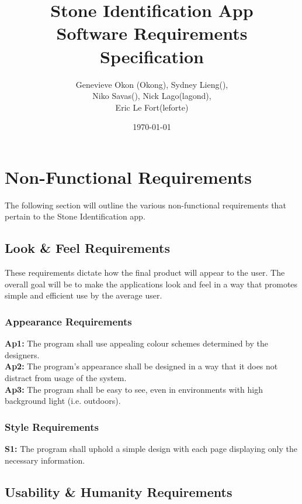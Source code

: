 \documentclass[titlepage]{article}
\begin{document}
\title{Stone Identification App \\
	Software Requirements Specification}
\author{Genevieve Okon (Okong), Sydney Lieng(),\\
	Niko Savas(), Nick Lago(lagond),\\
	Eric Le Fort(leforte)}
\date{\today}
\maketitle


\section{Non-Functional Requirements}
The following section will outline the various non-functional requirements that pertain to the Stone Identification app.

\subsection{Look \& Feel Requirements}
These requirements dictate how the final product will appear to the user. The overall goal will be to make the applications look and feel in a way that promotes simple and efficient use by the average user.
\subsubsection{Appearance Requirements}
\textbf{Ap1:} The program shall use appealing colour schemes determined by the designers.\\

\noindent\textbf{Ap2:} The program's appearance shall be designed in a way that it does not distract from usage of the system.\\

\noindent\textbf{Ap3:} The program shall be easy to see, even in environments with high background light (i.e. outdoors).

\subsubsection{Style Requirements}
\textbf{S1:} The program shall uphold a simple design with each page displaying only the necessary information.

\subsection{Usability \& Humanity Requirements}
\end{document}
